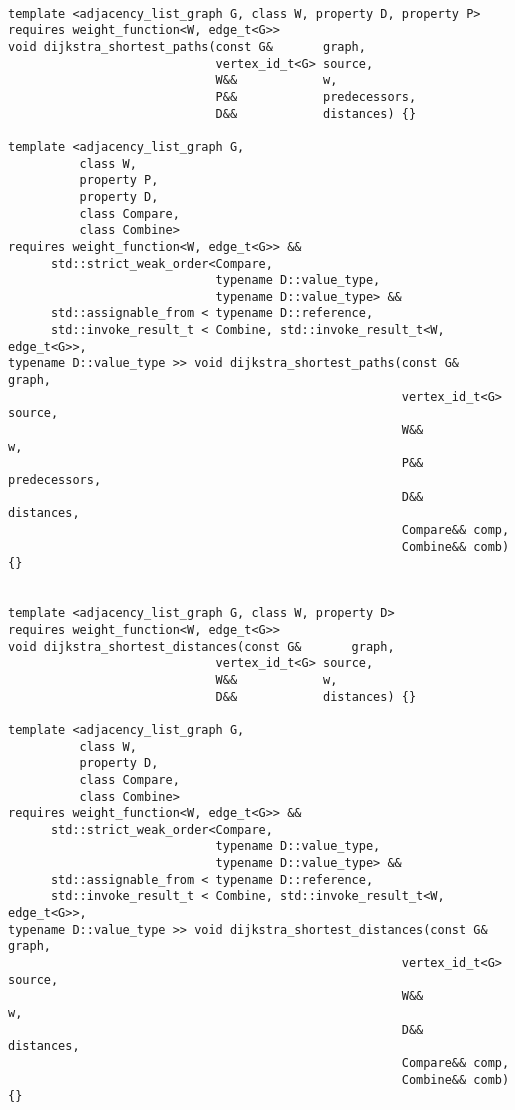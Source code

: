 \begin{lstlisting}

template <adjacency_list_graph G, class W, property D, property P>
requires weight_function<W, edge_t<G>>
void dijkstra_shortest_paths(const G&       graph,
                             vertex_id_t<G> source,
                             W&&            w,
                             P&&            predecessors,
                             D&&            distances) {}

template <adjacency_list_graph G,
          class W,
          property P,
          property D,
          class Compare,
          class Combine>
requires weight_function<W, edge_t<G>> &&
      std::strict_weak_order<Compare,
                             typename D::value_type,
                             typename D::value_type> &&
      std::assignable_from < typename D::reference,
      std::invoke_result_t < Combine, std::invoke_result_t<W, edge_t<G>>,
typename D::value_type >> void dijkstra_shortest_paths(const G&       graph,
                                                       vertex_id_t<G> source,
                                                       W&&            w,
                                                       P&&       predecessors,
                                                       D&&       distances,
                                                       Compare&& comp,
                                                       Combine&& comb) {}


template <adjacency_list_graph G, class W, property D>
requires weight_function<W, edge_t<G>>
void dijkstra_shortest_distances(const G&       graph,
                             vertex_id_t<G> source,
                             W&&            w,
                             D&&            distances) {}

template <adjacency_list_graph G,
          class W,
          property D,
          class Compare,
          class Combine>
requires weight_function<W, edge_t<G>> &&
      std::strict_weak_order<Compare,
                             typename D::value_type,
                             typename D::value_type> &&
      std::assignable_from < typename D::reference,
      std::invoke_result_t < Combine, std::invoke_result_t<W, edge_t<G>>,
typename D::value_type >> void dijkstra_shortest_distances(const G&       graph,
                                                       vertex_id_t<G> source,
                                                       W&&            w,
                                                       D&&       distances,
                                                       Compare&& comp,
                                                       Combine&& comb) {}


\end{lstlisting}

